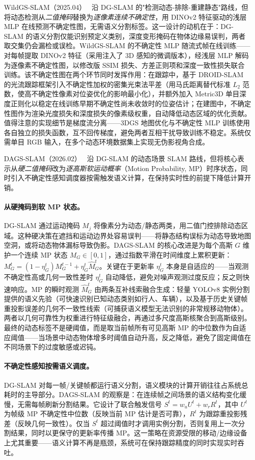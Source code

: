WildGS-SLAM（2025.04）~\cite{2504_03886} 沿 DG-SLAM 的"检测动态-排除-重建静态"路线，但将动态检测从\emph{二值掩码}替换为\emph{逐像素连续不确定性}，用 DINOv2 特征驱动的浅层 MLP 在线预测不确定性图，无需语义分割标签。这一设计的动机在于：DG-SLAM 的语义分割仅能识别预定义类别，深度变形掩码在物体边缘易误判，两者取交集仍会漏检或误检。WildGS-SLAM 的不确定性 MLP 随流式帧在线训练——对每帧提取 DINOv2 特征（采用注入了 3D 感知的微调版本），经浅层 MLP 解码为逐像素不确定性图，以修改版 SSIM 损失、方差正则项和深度一致性损失联合训练。该不确定性图在两个环节同时发挥作用：在跟踪中，基于 DROID-SLAM 的光流跟踪框架引入不确定性加权的密集光束法平差（用马氏距离替代标准 $L_2$ 范数，使高不确定性像素对位姿优化的影响最小化），并额外加入 Metric3D 单目深度正则化以稳定在线训练早期不确定性尚未收敛时的位姿估计；在建图中，不确定性图作为渲染光度损失和深度损失的像素级权重，自动降低动态区域的优化贡献。值得注意的实现细节是梯度流分离——3DGS 地图优化与不确定性 MLP 训练使用各自独立的损失函数，互不回传梯度，避免两者互相干扰导致训练不稳定。系统仅需单目 RGB 输入，在多个动态环境数据集上实现无伪影视角合成。

DAGS-SLAM（2026.02）~\cite{2602_21644} 沿 DG-SLAM 的动态场景 SLAM 路线，但将核心表示从\emph{硬二值掩码}改为\emph{逐高斯软运动概率}（Motion Probability, MP）时序状态，同时引入不确定性感知调度器按需触发语义计算，在保持实时性的前提下降低计算开销。

\paragraph{从硬掩码到软 MP 状态。}
DG-SLAM 通过运动掩码 $M_j$ 将像素分为动态/静态两类，用二值门控排除动态区域。这种硬决策在遮挡和运动边界处容易误判——将静态结构误标为动态导致地图空洞，或将动态物体漏标导致伪影。DAGS-SLAM 的核心改进是为每个高斯 $G$ 维护一个连续 MP 状态 $M_G \in [0, 1]$，通过指数平滑在时间维度上累积更新：$M_G^{t} = (1-\eta_G^{t}) M_G^{t-1} + \eta_G^{t} \hat{M}_G^{t}$。关键在于更新率 $\eta_G^{t}$ 本身是自适应的——当观测不确定性高或几何一致性差时 $\eta_G^{t}$ 自动降低，避免对噪声观测过度反应；反之则快速响应。MP 的瞬时观测 $\hat{M}_G^{t}$ 由两条互补线索融合生成：轻量 YOLOv8 实例分割提供的语义先验（可快速识别已知动态类别如行人、车辆），以及基于历史关键帧重投影误差的几何不一致性线索（可捕获语义模型无法识别的非常规移动物体）。两者以几何可靠性为权重进行特征级融合，再通过多尺度高斯核聚合到高斯级别。最终的动态标签不是硬阈值，而是取当前帧所有可见高斯 MP 的中位数作为自适应阈值——当场景中动态物体增多时阈值自动升高，反之降低，避免了固定阈值在不同场景下的过度敏感或迟钝。

\paragraph{不确定性感知按需语义调度。}
DG-SLAM 对每一帧/关键帧都运行语义分割，语义模块的计算开销往往占系统总耗时的主导部分。DAGS-SLAM 的观察是：在连续帧之间场景的语义结构变化缓慢，无需每帧刷新分割结果。它设计了联合触发信号 $S^t = w_u U^t + w_r R^t$，其中 $U^t$ 为帧级 MP 不确定性中位数（反映当前 MP 估计是否可靠），$R^t$ 为跟踪重投影残差（反映几何一致性）。仅当 $S^t$ 超过阈值时才调用实例分割，否则复用上一次分割结果，同时以更保守的更新率传播 MP。这一策略在资源受限的移动/边缘设备上尤其重要——语义计算不再是瓶颈，系统可在保持跟踪精度的同时实现实时吞吐。


